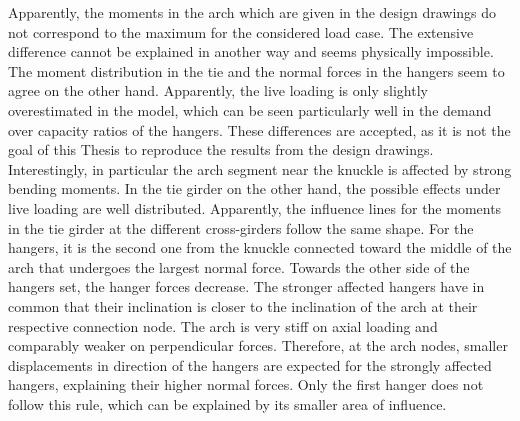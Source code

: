 Apparently, the moments in the arch which are given in the design drawings do not correspond to the maximum for the considered load case. The extensive difference cannot be explained in another way and seems physically impossible. The moment distribution in the tie and the normal forces in the hangers seem to agree on the other hand. Apparently, the live loading is only slightly overestimated in the model, which can be seen particularly well in the demand over capacity ratios of the hangers. These differences are accepted, as it is not the goal of this Thesis to reproduce the results from the design drawings. Interestingly, in particular the arch segment near the knuckle is affected by strong bending moments. In the tie girder on the other hand, the possible effects under live loading are well distributed. Apparently, the influence lines for the moments in the tie girder at the different cross-girders follow the same shape. For the hangers, it is the second one from the knuckle connected toward the middle of the arch that undergoes the largest normal force. Towards the other side of the hangers set, the hanger forces decrease. The stronger affected hangers have in common that their inclination is closer to the inclination of the arch at their respective connection node. The arch is very stiff on axial loading and comparably weaker on perpendicular forces. Therefore, at the arch nodes, smaller displacements in direction of the hangers are expected for the strongly affected hangers, explaining their higher normal forces. Only the first hanger does not follow this rule, which can be explained by its smaller area of influence. \medskip